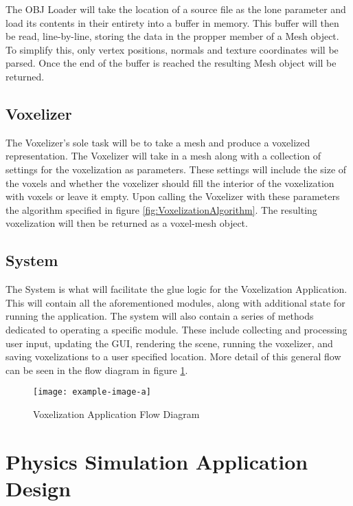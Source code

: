 The OBJ Loader will take the location of a source file as the lone parameter and load its contents in their
entirety into a buffer in memory. This buffer will then be read, line-by-line, storing the data in the propper
member of a Mesh object. To simplify this, only vertex positions, normals and texture coordinates will be parsed.
Once the end of the buffer is reached the resulting Mesh object will be returned.

\subsection{Voxelizer}

The Voxelizer's sole task will be to take a mesh and produce a voxelized representation. The Voxelizer will take in 
a mesh along with a collection of settings for the voxelization as parameters. These settings will include the size 
of the voxels and whether the voxelizer should fill the interior of the voxelization with voxels or leave it empty.
Upon calling the Voxelizer with these parameters the algorithm specified in figure \ref{fig:VoxelizationAlgorithm}.
The resulting voxelization will then be returned as a voxel-mesh object.

\subsection{System}

The System is what will facilitate the glue logic for the Voxelization Application. This will contain all the
aforementioned modules, along with additional state for running the application. The system will also contain a series 
of methods dedicated to operating a specific module. These include collecting and processing user input, updating 
the GUI, rendering the scene, running the voxelizer, and saving voxelizations to a user specified location. More 
detail of this general flow can be seen in the flow diagram in figure \ref{fig:VoxelizationApplicationFlowDiagram}.

\begin{figure}[h]
  \centering
  \texttt{[image: example-image-a]}
  \caption{Voxelization Application Flow Diagram}
  \label{fig:VoxelizationApplicationFlowDiagram}
\end{figure}

\section{Physics Simulation Application Design}

